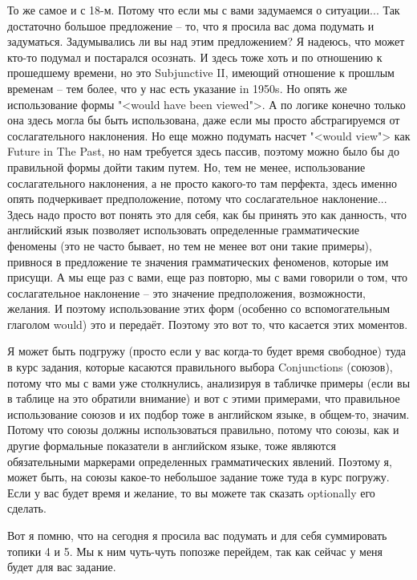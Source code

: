 \documentclass[main.tex]{subfiles}
\begin{document}
То же самое и с 18-м.
Потому что если мы с вами задумаемся о ситуации...
Так достаточно большое предложение -- то, что я просила вас дома подумать и задуматься.
Задумывались ли вы над этим предложением?
Я надеюсь, что может кто-то подумал и постарался осознать.
И здесь тоже хоть и по отношению к прошедшему времени, но это Subjunctive II, имеющий отношение к прошлым временам -- тем более, что у нас есть указание in 1950s.
Но опять же использование формы "<would have been viewed">.
А по логике конечно только она здесь могла бы быть использована, даже если мы просто абстрагируемся от сослагательного наклонения.
Но еще можно подумать насчет "<would view"> как Future in The Past, но нам требуется здесь пассив, поэтому можно было бы до правильной формы дойти таким путем.
Но, тем не менее, использование сослагательного наклонения, а не просто какого-то там перфекта, здесь именно опять подчеркивает предположение, потому что сослагательное наклонение...
Здесь надо просто вот понять это для себя, как бы принять это как данность, что английский язык позволяет использовать определенные грамматические феномены (это не часто бывает, но тем не менее вот они такие примеры), привнося в предложение те значения грамматических феноменов, которые им присущи.
А мы еще раз с вами, еще раз повторю, мы с вами говорили о том, что сослагательное наклонение -- это значение предположения, возможности, желания.
И поэтому использование этих форм (особенно со вспомогательным глаголом would) это и передаёт.
Поэтому это вот то, что касается этих моментов.

Я может быть подгружу (просто если у вас когда-то будет время свободное) туда в курс задания, которые касаются правильного выбора Conjunctions (союзов), потому что мы с вами уже столкнулись, анализируя в табличке примеры (если вы в таблице на это обратили внимание) и вот с этими примерами, что правильное использование союзов и их подбор тоже в английском языке, в общем-то, значим.
Потому что союзы должны использоваться правильно, потому что союзы, как и другие формальные показатели в английском языке, тоже являются обязательными маркерами определенных грамматических явлений.
Поэтому я, может быть, на союзы какое-то небольшое задание тоже туда в курс погружу.
Если у вас будет время и желание, то вы можете так сказать optionally его сделать.

\newpage
{}

Вот я помню, что на сегодня я просила вас подумать и для себя суммировать топики 4 и 5.
Мы к ним чуть-чуть попозже перейдем, так как сейчас у меня будет для вас задание.
\end{document}
